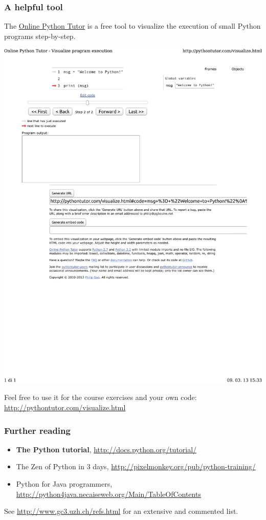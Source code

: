 \documentclass[english,serif,mathserif,xcolor=pdftex,dvipsnames,table]{beamer}
\begin{document}
\begin{frame}
  \frametitle{A helpful tool}

  The \href{http://pythontutor.com}{Online Python Tutor} is a free
  tool to visualize the execution of small Python programs
  step-by-step.

  \+
  \href{http://tinyurl.com/cf5ftwr}{%
    \centering
    \includegraphics[width=1.0\linewidth,viewport=0 600 500 750,clip]{fig/pythontutor}
  }

  \+ Feel free to use it for the course exercises and your own code:
  \url{http://pythontutor.com/visualize.html}
\end{frame}

\begin{frame}
  \frametitle{Further reading}

  \begin{itemize}
    \item \textbf{The Python tutorial},
      {\small \url{http://docs.python.org/tutorial/}}
    \item {The Zen of Python in 3 days},
      {\small \url{http://pixelmonkey.org/pub/python-training/}}
    \item {Python for Java programmers},
      {\small \url{http://python4java.necaiseweb.org/Main/TableOfContents}}
  \end{itemize}

  \+
  See {\small\url{http://www.gc3.uzh.ch/refs.html}}
  for an extensive and commented list.

\end{frame}
\end{document}
